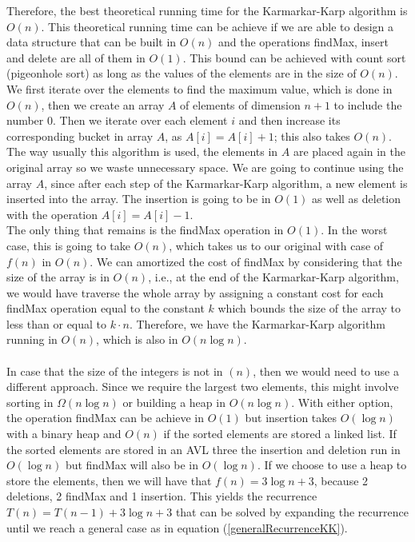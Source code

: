 \documentclass[tikz, 12pt]{scrartcl}
\begin{document}
Therefore, the best theoretical running time for the Karmarkar-Karp algorithm is $O(n)$. This theoretical running time can be achieve if we are able to design a data structure that can be built in $O(n)$ and the operations findMax, insert and delete are all of them in $O(1)$. This bound can be achieved with count sort (pigeonhole sort) as long as the values of the elements are in the size of $O(n)$. \\
We first iterate over the elements to find the maximum value, which is done in $O(n)$, then we create an array $A$ of elements of dimension $n + 1$ to include the number $0$. Then we iterate over each element $i$ and then increase its corresponding  bucket in array $A$, as $A[i] = A[i] + 1$; this also takes $O(n)$. The way usually this algorithm is used, the elements in $A$ are placed again in the original array so we waste unnecessary space. We are going to continue using the array $A$, since after each step of the Karmarkar-Karp algorithm, a new element is inserted into the array. The insertion is going to be in $O(1)$ as well as deletion with the operation $A[i] = A[i] - 1$.\\
The only thing that remains is the findMax operation in $O(1)$. In the worst case, this is going to take $O(n)$, which takes us to our original with case of $f(n)$ in $O(n)$. We can amortized the cost of findMax by considering that the size of the array is in $O(n)$, i.e., at the end of the Karmarkar-Karp algorithm, we would have traverse the whole array by assigning a constant cost for each findMax operation equal to the constant $k$ which bounds the size of the array to less than or equal to $k \cdot n$. Therefore, we have the Karmarkar-Karp algorithm running in $O(n)$, which is also in $O(n \log n)$.\\
\\
In case that the size of the integers is not in $(n)$, then we would need to use a different approach. Since we require the largest two elements, this might involve sorting in $\Omega(n \log n)$ or building a heap in $O(n \log n)$. With either option, the operation findMax can be achieve in $O(1)$ but insertion takes $O(\log n)$ with a binary heap and $O(n)$ if the sorted elements are stored a linked list. If the sorted elements are stored in an AVL three the insertion and deletion run in $O(\log n)$ but findMax will also be in $O(\log n)$. If we choose to use a heap to store the elements, then we will have that $f(n) = 3 \log n + 3$, because 2 deletions, 2 findMax and 1 insertion. This yields the recurrence $T(n) = T(n - 1) + 3 \log n + 3$ that can be solved by expanding the recurrence until we reach a general case as in equation (\ref{generalRecurrenceKK}).
\end{document}
